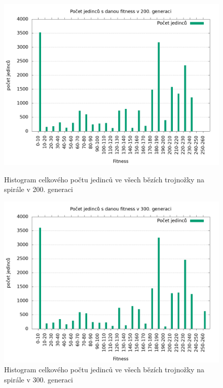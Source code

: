\begin{figure}[h]
    \begin{minipage}[c]{0.48\linewidth}
        \includegraphics[width=\linewidth]{obrazky/trojnozka_spirala_fitnessHistogram200.png}
        \caption{Histogram celkového počtu jedinců ve všech bězích trojnožky na spirále v 200. generaci}
    \end{minipage}
    \hfill
    \begin{minipage}[c]{0.48\linewidth}
        \includegraphics[width=\linewidth]{obrazky/trojnozka_spirala_fitnessHistogram300.png}
        \caption{Histogram celkového počtu jedinců ve všech bězích trojnožky na spirále v 300. generaci}
    \end{minipage}
\end{figure}

